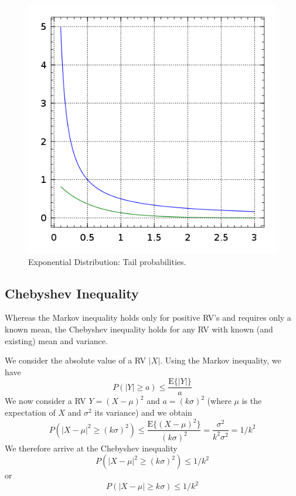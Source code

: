 \begin{figure}[h]
\centering
\includegraphics[scale=0.35]{images/exponential.png}
\caption{Exponential Distribution: Tail probabilities.}
\end{figure}

\subsection*{Chebyshev Inequality}

Whereas the Markov inequality holds only for positive RV's and requires only a known mean, the Chebyshev inequality holds for any RV with known (and existing) mean and variance.

We consider the absolute value of a RV $|X|$. Using the Markov inequality, we have
%
\begin{equation*}
  P(|Y| \geq a) \leq \frac{\mathrm{E}\{|Y|\}}{a}
\end{equation*}
%
We now consider a RV $Y = (X - \mu)^2$ and $a = (k \sigma)^2$ (where $\mu$ is the expectation of $X$ and $\sigma^2$ its variance) and we obtain
%
\begin{equation*}
  P(|X-\mu|^2 \geq (k \sigma)^2) \leq \frac{\mathrm{E}\{(X-\mu)^2\}}{(k \sigma)^2} = \frac{\sigma^2}{k^2 \sigma^2} = 1 / k^2
\end{equation*}
%
%
We therefore arrive at the Chebyshev inequality
%
\begin{equation*}
    P(|X-\mu|^2 \geq (k \sigma)^2) \leq 1 / k^2
\end{equation*}
%
or
%
\begin{equation*}
    P(|X-\mu| \geq k \sigma) \leq 1 / k^2
\end{equation*}


